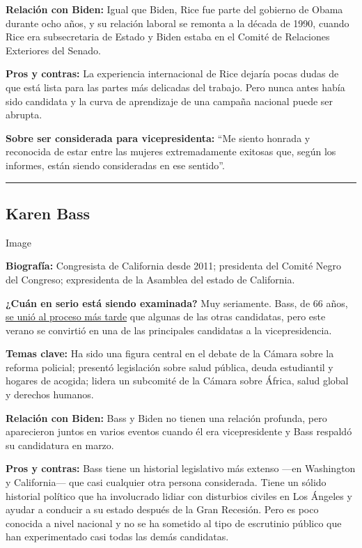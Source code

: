 \textbf{Relación con Biden:} Igual que Biden, Rice fue parte del
gobierno de Obama durante ocho años, y su relación laboral se remonta a
la década de 1990, cuando Rice era subsecretaria de Estado y Biden
estaba en el Comité de Relaciones Exteriores del Senado.

\textbf{Pros y contras:} La experiencia internacional de Rice dejaría
pocas dudas de que está lista para las partes más delicadas del trabajo.
Pero nunca antes había sido candidata y la curva de aprendizaje de una
campaña nacional puede ser abrupta.

\textbf{Sobre ser considerada para vicepresidenta:} ``Me siento honrada
y reconocida de estar entre las mujeres extremadamente exitosas que,
según los informes, están siendo consideradas en ese sentido''.

\begin{center}\rule{0.5\linewidth}{\linethickness}\end{center}

\hypertarget{karen-bass}{%
\subsection{Karen Bass}\label{karen-bass}}

Image

\textbf{Biografía:} Congresista de California desde 2011; presidenta del
Comité Negro del Congreso; expresidenta de la Asamblea del estado de
California.

\textbf{¿Cuán en serio está siendo examinada?} Muy seriamente. Bass, de
66 años,
\href{https://www.nytimes3xbfgragh.onion/2020/06/23/us/politics/karen-bass-joe-biden-vp.html}{se
unió al proceso más tarde} que algunas de las otras candidatas, pero
este verano se convirtió en una de las principales candidatas a la
vicepresidencia.

\textbf{Temas clave:} Ha sido una figura central en el debate de la
Cámara sobre la reforma policial; presentó legislación sobre salud
pública, deuda estudiantil y hogares de acogida; lidera un subcomité de
la Cámara sobre África, salud global y derechos humanos.

\textbf{Relación con Biden:} Bass y Biden no tienen una relación
profunda, pero aparecieron juntos en varios eventos cuando él era
vicepresidente y Bass respaldó su candidatura en marzo.

\textbf{Pros y contras:} Bass tiene un historial legislativo más extenso
---en Washington y California--- que casi cualquier otra persona
considerada. Tiene un sólido historial político que ha involucrado
lidiar con disturbios civiles en Los Ángeles y ayudar a conducir a su
estado después de la Gran Recesión. Pero es poco conocida a nivel
nacional y no se ha sometido al tipo de escrutinio público que han
experimentado casi todas las demás candidatas.

